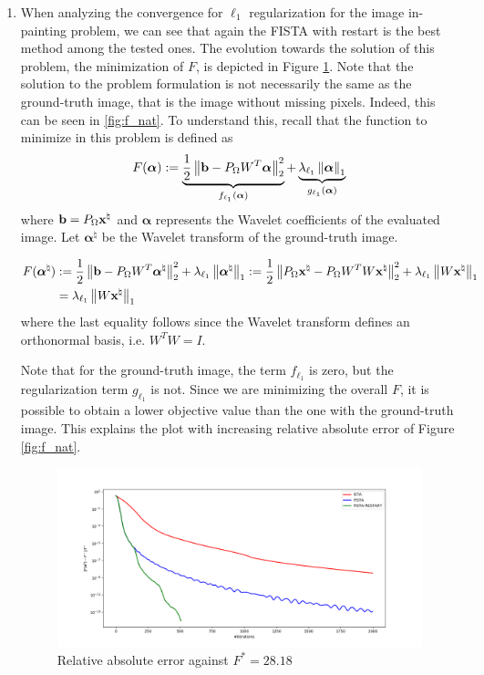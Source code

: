 \documentclass{article}
\begin{document}
\begin{enumerate}[label=2.\arabic*]
    
    \item When analyzing the convergence for $\ell_1$ regularization for the image in-painting problem, we can see that again the FISTA with restart is the best method among the tested ones. The evolution towards the solution of this problem, the minimization of $F$, is depicted in Figure \ref{fig:f_star}. Note that the solution to the problem formulation is not necessarily the same as the ground-truth image, that is the image without missing pixels. Indeed, this can be seen in \ref{fig:f_nat}. To understand this, recall that the function to minimize in this problem is defined as
    \begin{align}
        F(\boldsymbol{\alpha}) := \underbrace{\frac{1}{2}\left\lVert\mathbf{b} - P_{\Omega} W^T \boldsymbol{\alpha}\right\rVert^2_2}_{f_{\ell_1}(\boldsymbol{\alpha})} + \underbrace{\lambda_{\ell_1} \left\lVert\boldsymbol{\alpha}\right\rVert_1}_{g_{\ell_1}(\boldsymbol{\alpha})}
    \end{align}
    where $\mathbf{b} = P_{\Omega} \mathbf{x}^\natural$ and $\boldsymbol{\alpha}$ represents the Wavelet coefficients of the evaluated image. Let $\boldsymbol{\alpha}^\natural$ be the Wavelet transform of the ground-truth image.
    
    \begin{align}
        F(\boldsymbol{\alpha}^\natural) &:= \frac{1}{2}\left\lVert\mathbf{b} - P_{\Omega} W^T \boldsymbol{\alpha}^\natural\right\rVert^2_2 + \lambda_{\ell_1} \left\lVert\boldsymbol{\alpha}^\natural\right\rVert_1 := \frac{1}{2}\left\lVert P_\Omega \mathbf{x}^\natural - P_{\Omega} W^T W \mathbf{x}^\natural\right\rVert^2_2 + \lambda_{\ell_1} \left\lVert W \mathbf{x}^\natural\right\rVert_1 \\
        &= \lambda_{\ell_1} \left\lVert W \mathbf{x}^\natural\right\rVert_1 
    \end{align}
    where the last equality follows since the Wavelet transform defines an orthonormal basis, i.e. $W^T W= I$.
    
    Note that for the ground-truth image, the term $f_{\ell_1}$ is zero, but the regularization term $g_{\ell_1}$ is not. Since we are minimizing the overall $F$, it is possible to obtain a lower objective value than the one with the ground-truth image. This explains the plot with increasing relative absolute error of Figure \ref{fig:f_nat}.
    
    \begin{figure}[H]
        \centering
        \includegraphics[width=.9\textwidth]{img/against_f_star.png}
        \caption{Relative absolute error against $F^*=28.18$}
        \label{fig:f_star}
    \end{figure}
    

\end{enumerate}
\end{document}
